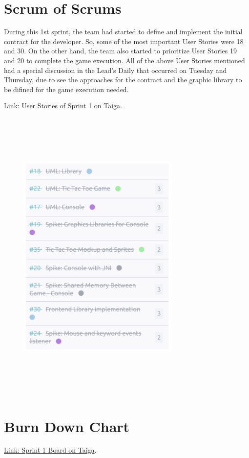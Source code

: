 \hypertarget{sos-s1} {
\section{Scrum of Scrums}\label{Scrum of Scrums} 
During this 1st sprint, the team had started to define and implement the initial contract 
for the developer. So, some of the most important User Stories were 18 and 30. On the other hand, 
the team also started to prioritize User Stories 19 and 20 to complete the game execution.
All of the above User Stories mentioned had a special discussion in the Lead's Daily that
occurred on Tuesday and Thursday, due to see the approaches for the contract 
and the graphic library to be difined for the game execution needed.
}

\href{https://tree.taiga.io/project/joseluis-teran-coffeetime/taskboard/sprint-1-9301}{Link: User Stories of Sprint 1 on Taiga}.

\begin{figure}
\centering
\includegraphics[width=8cm, height=15cm]{./assets/us-s1.png}
\end{figure}

\hypertarget{burndownchart-s1}{
\section{Burn Down Chart}\label{Burn Down Chart S1}}
\href{https://tree.taiga.io/project/joseluis-teran-coffeetime/taskboard/sprint-1-9301}{Link: Sprint 1 Board on Taiga}.

